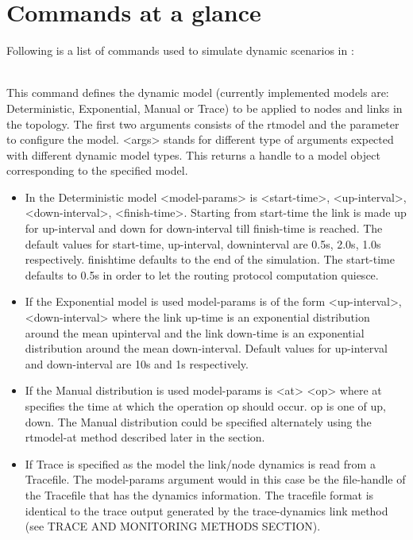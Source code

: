 \section{Commands at a glance}
\label{sec:dynamicscommand}

Following is a list of commands used to simulate dynamic scenarios in \ns:

\begin{flushleft}
\\
This command defines the dynamic model (currently implemented models are:
Deterministic, Exponential, Manual or Trace) to be applied to nodes and
links in the topology. The first two arguments consists of the rtmodel and
the parameter to configure the model. <args> stands for different type of
arguments expected with different dynamic model types. This returns a
handle to a model object corresponding to the specified model. 
\begin{itemize}
\item In the Deterministic model <model-params> is <start-time>, 
<up-interval>, <down-interval>, <finish-time>. Starting from start-time
the link is made up for up-interval and down for down-interval till
finish-time is reached. The default values for start-time, up-interval,
downinterval are 0.5s, 2.0s, 1.0s respectively. finishtime defaults to the
end of the simulation. The start-time defaults to 0.5s in order to let the
routing protocol computation quiesce. 

\item If the Exponential model is used model-params is of the form
<up-interval>, <down-interval> where the link up-time is an exponential
distribution around the mean upinterval and the link down-time is an
exponential distribution around the mean down-interval. Default values for
up-interval and down-interval are 10s and 1s respectively. 

\item If the Manual distribution is used model-params is <at> <op> where
at
specifies the time at which the operation op should occur. op is one of
up, down. The Manual distribution could be specified alternately using the
rtmodel-at method described later in the section. 

\item If Trace is specified as the model the link/node dynamics is read
from a
Tracefile. The model-params argument would in this case be the file-handle
of the Tracefile that has the dynamics information. The tracefile format
is identical to the trace output generated by the trace-dynamics link
method (see TRACE AND MONITORING METHODS SECTION). 
\end{itemize}



\end{flushleft}
